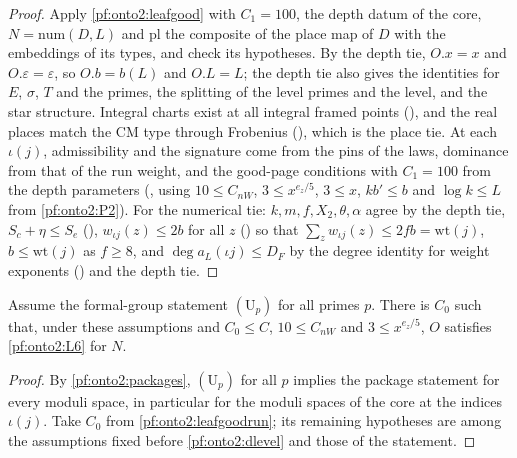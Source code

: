 \begin{proof}
Apply \cref{pf:onto2:leafgood} with $C_1=100$, the depth datum of the core, $N=\mathrm{num}(D,L)$ and $\mathrm{pl}$ the composite of the
place map of $D$ with the embeddings of its types, and check its hypotheses. By the depth tie, $O.x=x$ and $O.\varepsilon=\varepsilon$,
so $O.b=b(L)$ and $O.L=L$; the depth tie also gives the identities for $E$, $\sigma$, $T$ and the primes, the splitting of the level
primes and the level, and the star structure. Integral charts exist at all integral framed points
(), and the real places match the CM type through Frobenius
(), which is the place tie. At each $\iota(j)$, admissibility and the
signature come from the pins of the laws, dominance from that of the run weight, and the good-page conditions with $C_1=100$ from the
depth parameters (, using $10\le C_{nW}$,
$3\le x^{e_z/5}$, $3\le x$, $kb'\le b$ and $\log k\le L$ from \ref{pf:onto2:P2}). For the numerical tie: $k,m,f,X_2,\theta,\alpha$ agree by
the depth tie, $S_c+\eta\le S_e$ (), $w_{\iota j}(z)\le2b$ for all $z$
() so that $\sum_zw_{\iota j}(z)\le2fb=\mathrm{wt}(j)$, $b\le\mathrm{wt}(j)$ as
$f\ge8$, and $\deg a_L(\iota j)\le D_F$ by the degree identity for weight exponents
() and the depth tie.
\end{proof}

\begin{proposition}\label{pf:onto2:dgood}
Assume the formal-group statement $(\mathrm U_p)$ for all primes $p$. There is $C_0$ such that, under these assumptions and
$C_0\le C$, $10\le C_{nW}$ and $3\le x^{e_z/5}$, $O$ satisfies \ref{pf:onto2:L6} for $N$.
\end{proposition}

\begin{proof}
By \cref{pf:onto2:packages}, $(\mathrm U_p)$ for all $p$ implies the package statement for every moduli space, in particular for the
moduli spaces of the core at the indices $\iota(j)$. Take $C_0$ from \cref{pf:onto2:leafgoodrun}; its remaining hypotheses are among
the assumptions fixed before \cref{pf:onto2:dlevel} and those of the statement.
\end{proof}

